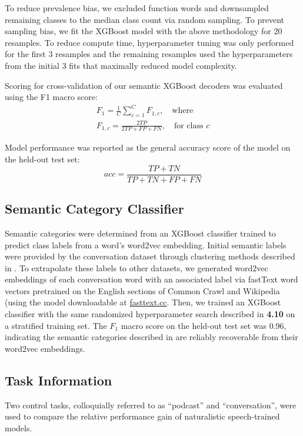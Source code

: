 \documentclass[pdflatex,sn-basic]{sn-jnl}%
\theoremstyle{thmstyleone}%
\theoremstyle{thmstyletwo}%
\theoremstyle{thmstylethree}%
\begin{document}
To reduce prevalence bias, we excluded function words and downsampled remaining classes to the median class count via random sampling. To prevent sampling bias, we fit the XGBoost model with the above methodology for 20 resamples. To reduce compute time, hyperparameter tuning was only performed for the first 3 resamples and the remaining resamples used the hyperparameters from the initial 3 fits that maximally reduced model complexity.

Scoring for cross-validation of our semantic XGBoost decoders was evaluated using the F1 macro score:
\begin{gather*}
F_1=\frac{1}{C}\sum_{c=1}^CF_{1,c}, \quad\text{where}\\
F_{1,c}=\frac{2TP}{2TP+FP+FN}, \quad\text{for class $c$}
\end{gather*}

Model performance was reported as the general accuracy score of the model on the held-out test set:
\[
acc=\frac{TP+TN}{TP+TN+FP+FN}
\]

\subsection{Semantic Category Classifier}\label{subsec11}
Semantic categories were determined from an XGBoost classifier trained to predict class labels from a word’s word2vec embedding. Initial semantic labels were provided by the conversation dataset through clustering methods described in \citet{bib53}. To extrapolate these labels to other datasets, we generated word2vec embeddings of each conversation word with an associated label via fastText word vectors pretrained on the English sections of Common Crawl and Wikipedia (using the model downloadable at \href{https://fasttext.cc/docs/en/crawl-vectors.html}{fasttext.cc}. Then, we trained an XGBoost classifier with the same randomized hyperparameter search described in \textbf{4.10} on a stratified training set. The $F_1$ macro score on the held-out test set was 0.96, indicating the semantic categories described in \citet{bib53} are reliably recoverable from their word2vec embeddings. 

\subsection{Task Information}\label{subsec12}
Two control tasks, colloquially referred to as “podcast” and “conversation”, were used to compare the relative performance gain of naturalistic speech-trained models.
\end{document}
